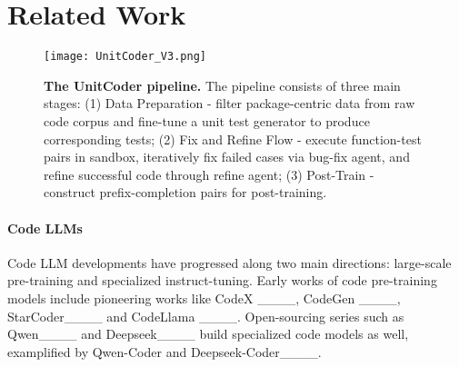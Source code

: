 \section{Related Work}
\begin{figure*}[h]
    \centering
    \texttt{[image: UnitCoder\_V3.png]}
    \caption{\textbf{The UnitCoder pipeline.} The pipeline consists of three main stages: (1) Data Preparation - filter package-centric data from raw code corpus and fine-tune a unit test generator to produce corresponding tests; (2) Fix and Refine Flow - execute function-test pairs in sandbox, iteratively fix failed cases via bug-fix agent, and refine successful code through refine agent; (3) Post-Train - construct prefix-completion pairs for post-training.}
    \label{fig:overall_framework}
\end{figure*}



\paragraph{Code LLMs}

Code LLM developments have progressed along two main directions: large-scale pre-training and specialized instruct-tuning.
Early works of code pre-training models include pioneering works like CodeX ____, CodeGen ____, StarCoder____ and CodeLlama ____.
Open-sourcing series such as Qwen____ and Deepseek____ build specialized code models as well, examplified by Qwen-Coder and Deepseek-Coder____. 

